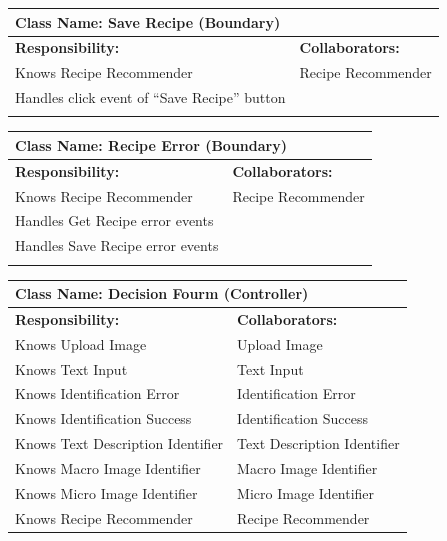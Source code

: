 \documentclass[]{article}
\begin{document}
\begin{itemize}
\begin{table}[ht]
\begin{tabular}{|p{6cm}|p{6cm}|}
		\vspace{1in} & \\
		\hline
		\end{tabular}
	\end{table}
	\begin{table}[ht]
		\centering
		\begin{tabular}{|p{6cm}|p{6cm}|}
		\hline 
		\multicolumn{2}{|l|}{\textbf{Class Name: Save Recipe (Boundary)}} \\
		\hline
		\textbf{Responsibility:} & \textbf{Collaborators:} \\
		\hline
		Knows Recipe Recommender & Recipe Recommender \\
		Handles click event of “Save Recipe” button & \\
		\vspace{1in} & \\
		\hline
		\end{tabular}
	\end{table}
	\begin{table}[ht]
		\centering
		\begin{tabular}{|p{6cm}|p{6cm}|}
		\hline 
		\multicolumn{2}{|l|}{\textbf{Class Name: Recipe Error (Boundary)}} \\
		\hline
		\textbf{Responsibility:} & \textbf{Collaborators:} \\
		\hline
		Knows Recipe Recommender & Recipe Recommender \\
		Handles Get Recipe error events & \\
		Handles Save Recipe error events & \\
		\vspace{1in} & \\
		\hline
		\end{tabular}
	\end{table}
	\begin{table}[ht]
		\centering
		\begin{tabular}{|p{6cm}|p{6cm}|}
		\hline 
		\multicolumn{2}{|l|}{\textbf{Class Name: Decision Fourm (Controller)}} \\
		\hline
		\textbf{Responsibility:} & \textbf{Collaborators:} \\
		\hline
		Knows Upload Image & Upload Image \\
		Knows Text Input & Text Input \\
		Knows Identification Error & Identification Error \\
		Knows Identification Success & Identification Success \\
		Knows Text Description Identifier &  Text Description Identifier \\
		Knows Macro Image Identifier & Macro Image Identifier \\
		Knows Micro Image Identifier & Micro Image Identifier \\
		Knows Recipe Recommender & Recipe Recommender \\


\end{tabular}
\end{table}
\end{itemize}
\end{document}

